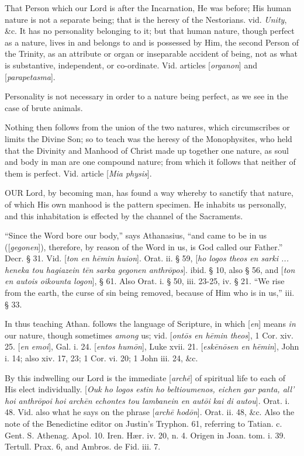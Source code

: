 That Person which our Lord is after the
Incarnation, He was before; His human nature is not a separate being;
that is the heresy of the Nestorians. vid. \emph{Unity}, \&c. It
has no personality belonging to it; but that human nature, though
perfect as a nature, lives in and belongs to and is possessed by Him,
the second Person of the Trinity, as an attribute or organ or
inseparable accident of being, not as what is substantive,
independent, or co-ordinate. Vid. articles [\emph{organon}] and [\emph{parapetasma}].

Personality is not necessary in order to a nature
being perfect, as we see in the case of brute animals.

Nothing then follows from the union of the two
natures, which circumscribes or limits the Divine Son; so to teach was
the heresy of the Monophysites, who held that the Divinity and Manhood
of Christ made up together one nature, as soul and body in man are one
compound nature; from which it follows that neither of them is
perfect. Vid. article [\emph{Mia physis}].


OUR
Lord, by becoming man, has found a way whereby to sanctify that
nature, of which His own manhood is the pattern specimen. He inhabits
us personally, and this inhabitation is effected by the channel of the
Sacraments.

``Since the Word bore our body,'' says Athanasius, ``and
came to be in us ([\emph{gegonen}]), therefore, by reason of the Word
in us, is God called our Father.'' Decr. § 31. Vid. [\emph{ton en h\={e}min
huion}]. Orat. ii. § 59, [\emph{ho logos theos en sarki ... heneka
tou hagiazein t\={e}n sarka gegonen anthr\={o}pos}]. ibid. §
10, also § 56, and [\emph{ton en autois oikounta logon}], § 61. Also
Orat. i. § 50, iii. 23-25, iv. § 21. ``We rise from the earth, the
curse of sin being removed, because of Him who is in us,'' iii. § 33.

In thus teaching Athan. follows the language of
Scripture, in which [\emph{en}] means \emph{in} our nature, though
sometimes \emph{among} us; vid. [\emph{ont\={o}s en h\={e}min theos}],
1 Cor. xiv. 25. [\emph{en emoi}], Gal. i. 24. [\emph{entos hum\={o}n}],
Luke xvii. 21. [\emph{esk\={e}n\={o}sen en h\={e}min}], John
i. 14; also xiv. 17, 23; 1 Cor. vi. 20; 1 John iii. 24, \&c.

By this indwelling our Lord is the immediate [\emph{arch\={e}}]
of spiritual life to each of His elect individually. [\emph{Ouk ho logos
estin ho beltioumenos, eichen gar panta, all' hoi anthr\={o}poi hoi arch\={e}n echontes tou lambanein en aut\={o}i}
\emph{kai di
autou}]. Orat. i. 48. Vid. also what he says on the phrase [\emph{arch\={e}
hod\={o}n}]. Orat. ii. 48, \&c. Also the note of the
Benedictine editor on Justin's Tryphon. 61, referring to Tatian. c.
Gent. S. Athenag. Apol. 10. Iren. Hær. iv. 20, n. 4. Origen in Joan.
tom. i. 39. Tertull. Prax. 6, and Ambros. de Fid. iii. 7.

